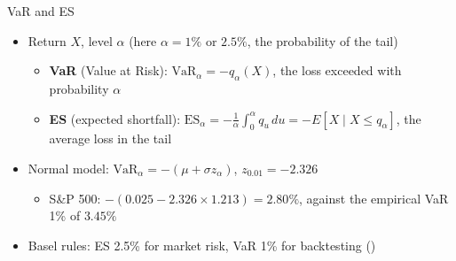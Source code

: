 \begin{frame}{VaR and ES}
\itemsize{\small}
\begin{itemize}
    \item Return $X$, level $\alpha$ (here $\alpha = 1\%$ or $2.5\%$, the probability of the tail)
    \begin{itemize}
        \item \textbf{VaR} (Value at Risk): $\mathrm{VaR}_\alpha = -q_\alpha(X)$, the loss exceeded with probability $\alpha$
        \item \textbf{ES} (expected shortfall): $\mathrm{ES}_\alpha = -\frac{1}{\alpha}\int_0^\alpha q_u\, du = -E[X \mid X \le q_\alpha]$, the average loss in the tail
    \end{itemize}
    \item Normal model: $\mathrm{VaR}_\alpha = -(\mu + \sigma z_\alpha)$, $z_{0.01} = -2.326$
    \begin{itemize}
        \item S\&P 500: $-(0.025 - 2.326 \times 1.213) = 2.80\%$, against the empirical VaR 1\% of $3.45\%$
    \end{itemize}
    \item Basel rules: ES 2.5\% for market risk, VaR 1\% for backtesting ()
\end{itemize}
\end{frame}

